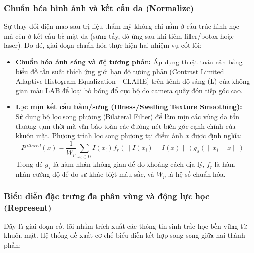 \subsubsection{Chuẩn hóa hình ảnh và kết cấu da (Normalize)}
Sự thay đổi diện mạo sau trị liệu thẩm mỹ không chỉ nằm ở cấu trúc hình học mà còn ở kết cấu bề mặt da (sưng tấy, đỏ ửng sau khi tiêm filler/botox hoặc laser). Do đó, giai đoạn chuẩn hóa thực hiện hai nhiệm vụ cốt lõi:
\begin{itemize}
    \item \textbf{Chuẩn hóa ánh sáng và độ tương phản:} Áp dụng thuật toán cân bằng biểu đồ tần suất thích ứng giới hạn độ tương phản (Contrast Limited Adaptive Histogram Equalization - CLAHE) trên kênh độ sáng (L) của không gian màu LAB để loại bỏ bóng đổ cục bộ do camera quầy đón tiếp góc cao.
    \item \textbf{Lọc mịn kết cấu bầm/sưng (Illness/Swelling Texture Smoothing):} Sử dụng bộ lọc song phương (Bilateral Filter) để làm mịn các vùng da tổn thương tạm thời mà vẫn bảo toàn các đường nét biên góc cạnh chính của khuôn mặt. Phương trình lọc song phương tại điểm ảnh $x$ được định nghĩa:
    \begin{equation}
        I^{filtered}(x) = \frac{1}{W_p} \sum_{x_i \in \Omega} I(x_i) f_r(\|I(x_i) - I(x)\|) g_s(\|x_i - x\|)
    \end{equation}
    Trong đó $g_s$ là hàm nhân không gian để đo khoảng cách địa lý, $f_r$ là hàm nhân cường độ để đo sự khác biệt màu sắc, và $W_p$ là hệ số chuẩn hóa.
\end{itemize}

\subsubsection{Biểu diễn đặc trưng đa phân vùng và động lực học (Represent)}
Đây là giai đoạn cốt lõi nhằm trích xuất các thông tin sinh trắc học bền vững từ khuôn mặt. Hệ thống đề xuất cơ chế biểu diễn kết hợp song song giữa hai thành phần:

